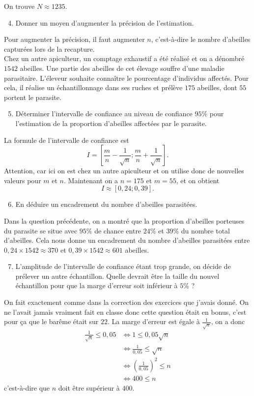 \documentclass[11pt]{article}
\begin{document}
On trouve $N\approx1235$.
\begin{enumerate}
    \setcounter{enumi}{3}
  \item Donner un moyen d'augmenter la précision de l'estimation.
\end{enumerate}
Pour augmenter la précision, il faut augmenter $n$, c'est-à-dire le nombre
d'abeilles capturées lors de la recapture.\\[5mm]
\noindent Chez un autre apiculteur, un comptage exhaustif a été réalisé et on a dénombré
$1542$ abeilles. Une partie des abeilles de cet élevage souffre d'une maladie
parasitaire. L'éleveur souhaite connaître le pourcentage d'individus affectés.
Pour cela, il réalise un échantillonnage dans ses ruches et prélève $175$
abeilles, dont $55$ portent le parasite.
\begin{enumerate}
    \setcounter{enumi}{4}
  \item Déterminer l'intervalle de confiance au niveau de confiance $95$\% pour
    l'estimation de la proportion d'abeilles affectées par le parasite.
\end{enumerate}
La formule de l'intervalle de confiance est
\[
  I=\left[ \frac{m}{n}-\frac{1}{\sqrt n};\frac{m}{n}+\frac{1}{\sqrt n} \right].
\]
Attention, car ici on est chez un autre apiculteur et on utilise donc de
nouvelles valeurs pour $m$ et $n$. Maintenant on a $n=175$ et $m=55$, et on
obtient
\[
  I\approx\left[ 0,24; 0,39 \right].
\]
\begin{enumerate}
    \setcounter{enumi}{5}
  \item En déduire un encadrement du nombre d'abeilles parasitées.
\end{enumerate}
Dans la question précédente, on a montré que la proportion d'abeilles porteuses
du parasite se situe avec $95$\% de chance entre $24$\% et $39$\% du nombre
total d'abeilles. Cela nous donne un encadrement du nombre d'abeilles
parasitées entre $0,24\times1542\approx370$ et $0,39\times1542\approx601$
abeilles.
\begin{enumerate}
    \setcounter{enumi}{6}
  \item L'amplitude de l'intervalle de confiance étant trop grande, on décide de prélever un
    autre échantillon. Quelle devrait être la taille du nouvel échantillon pour
    que la marge d'erreur soit inférieur à $5$\% ?
\end{enumerate}
On fait exactement comme dans la correction des exercices que j'avais donné. On
ne l'avait jamais vraiment fait en classe donc cette question était en bonus,
c'est pour ça que le barême était sur $22$. La marge d'erreur est égale à
$\frac{1}{\sqrt n}$, on a donc
\begin{align*}
  \frac{1}{\sqrt n} \leq 0,05 &\Longleftrightarrow 1\leq0,05\sqrt n \\
  &\Longleftrightarrow\frac{1}{0,05}\leq\sqrt n \\
  &\Longleftrightarrow\left( \frac{1}{0,05} \right)^2\leq n \\
  &\Longleftrightarrow400\leq n
\end{align*}
c'est-à-dire que $n$ doit être supérieur à $400$.
\end{document}
